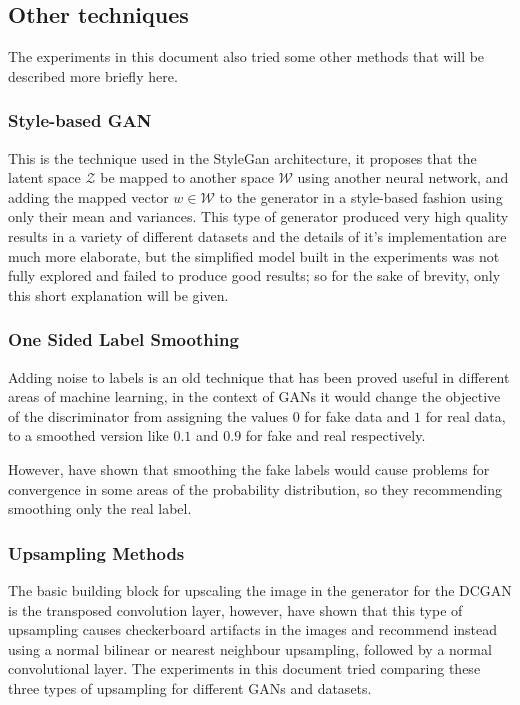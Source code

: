 \subsection{Other techniques}
The experiments in this document also tried some other methods that will be described more briefly here.

\subsubsection{Style-based GAN}
This is the technique used in the StyleGan \cite{styleGAN2018} architecture, it proposes that the latent space $\mathcal{Z}$ be mapped to another space $\mathcal{W}$ using another neural network, and adding the mapped vector $w \in \mathcal{W}$ to the generator in a style-based fashion using only their mean and variances. This type of generator produced very high quality results in a variety of different datasets and the details of it's implementation are much more elaborate, but the simplified model built in the experiments was not fully explored and failed to produce good results; so for the sake of brevity, only this short explanation will be given.

\subsubsection{One Sided Label Smoothing}
Adding noise to labels is an old technique that has been proved useful in different areas of machine learning, in the context of \acp{GAN} it would change the objective of the discriminator from assigning the values $0$ for fake data and $1$ for real data, to a smoothed version like $0.1$ and $0.9$ for fake and real respectively.

However, \textcite{improvedGANS2016} have shown that smoothing the fake labels would cause problems for convergence in some areas of the probability distribution, so they recommending smoothing only the real label.

\subsubsection{Upsampling Methods}
The basic building block for upscaling the image in the generator for the \gls{DCGAN} is the transposed convolution layer, however, \textcite{deconvolutionArtifacts2016} have shown that this type of upsampling causes checkerboard artifacts in the images and recommend instead using a normal bilinear or nearest neighbour upsampling, followed by a normal convolutional layer. The experiments in this document tried comparing these three types of upsampling for different \acp{GAN} and datasets.


